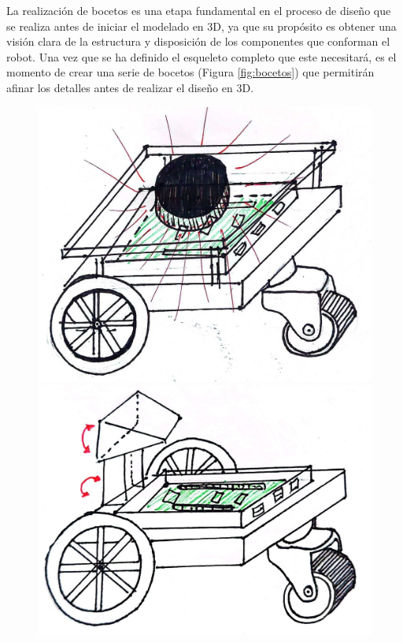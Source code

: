 La realización de bocetos es una etapa fundamental en el proceso de diseño que se realiza antes de iniciar el modelado en 3D, ya que su propósito es obtener una visión clara de la estructura y disposición de los componentes que conforman el robot. Una vez que se ha definido el esqueleto completo que este necesitará, es el momento de crear una serie de bocetos (Figura \ref{fig:bocetos}) que permitirán afinar los detalles antes de realizar el diseño en 3D.

\begin{figure}[ht!]
	\centering
	\begin{minipage}{0.4\linewidth}
		\centering
		\includegraphics[width=\linewidth]{figs/cap5/prototipo_laser.jpeg}
	\end{minipage}
	\hspace{2cm}
	\begin{minipage}{0.4\linewidth}
		\centering
		\includegraphics[width=\linewidth]{figs/cap5/prototipo_sin_laser.jpeg}

\end{minipage}
\end{figure}
